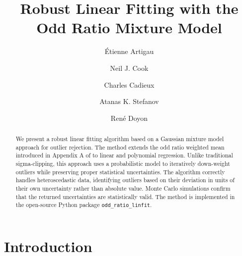 \documentclass[twocolumn]{aastex631}
\begin{document}
\title{Robust Linear Fitting with the Odd Ratio Mixture Model}

\author{\'Etienne Artigau}

\author{Neil J. Cook}

\author{Charles Cadieux}

\author{Atanas K. Stefanov}

\author{Ren\'e Doyon}


\begin{abstract}
We present a robust linear fitting algorithm based on a Gaussian mixture model
approach for outlier rejection. The method extends the odd ratio weighted mean
introduced in Appendix A of \citet{Artigau2022} to linear and polynomial
regression. Unlike traditional sigma-clipping, this approach uses a probabilistic
model to iteratively down-weight outliers while preserving proper statistical
uncertainties. The algorithm correctly handles heteroscedastic data, identifying
outliers based on their deviation in units of their own uncertainty rather than
absolute value. Monte Carlo simulations confirm that the returned uncertainties
are statistically valid. The method is implemented in the open-source Python
package \texttt{odd\_ratio\_linfit}.
\end{abstract}



\section{Introduction}
\label{sec:intro}
\end{document}

